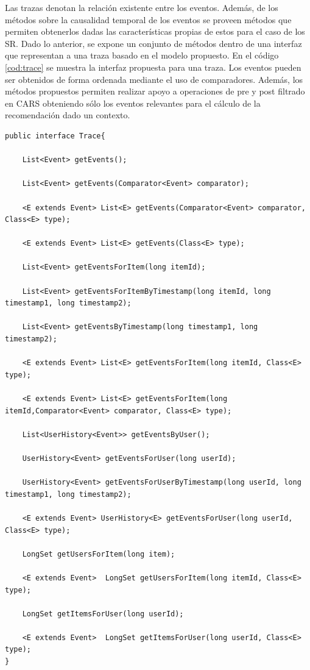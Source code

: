 Las trazas denotan la relación existente entre los eventos. Además, de los métodos sobre la causalidad temporal de los eventos se proveen métodos que permiten obtenerlos dadas las características propias de estos para el caso de los SR. Dado lo anterior, se expone un conjunto de métodos dentro de una interfaz que representan a una traza basado en el modelo propuesto. En el código \ref{cod:trace} se muestra la interfaz propuesta para una traza. Los eventos pueden ser obtenidos de forma ordenada mediante el uso de comparadores. Además, los métodos propuestos permiten realizar apoyo a operaciones de pre y post filtrado en CARS obteniendo sólo los eventos relevantes para el cálculo de la recomendación dado un contexto. 

\begin{lstlisting}[float, caption = Interfaz Trace, label = cod:trace]
public interface Trace{

    List<Event> getEvents();

    List<Event> getEvents(Comparator<Event> comparator);

    <E extends Event> List<E> getEvents(Comparator<Event> comparator, Class<E> type);

    <E extends Event> List<E> getEvents(Class<E> type);

    List<Event> getEventsForItem(long itemId);

    List<Event> getEventsForItemByTimestamp(long itemId, long timestamp1, long timestamp2);

    List<Event> getEventsByTimestamp(long timestamp1, long timestamp2);

    <E extends Event> List<E> getEventsForItem(long itemId, Class<E> type);

    <E extends Event> List<E> getEventsForItem(long itemId,Comparator<Event> comparator, Class<E> type);

    List<UserHistory<Event>> getEventsByUser();

    UserHistory<Event> getEventsForUser(long userId);

    UserHistory<Event> getEventsForUserByTimestamp(long userId, long timestamp1, long timestamp2);

    <E extends Event> UserHistory<E> getEventsForUser(long userId, Class<E> type);

    LongSet getUsersForItem(long item);

    <E extends Event>  LongSet getUsersForItem(long itemId, Class<E> type);  

    LongSet getItemsForUser(long userId);

    <E extends Event>  LongSet getItemsForUser(long userId, Class<E> type);
}
\end{lstlisting}

